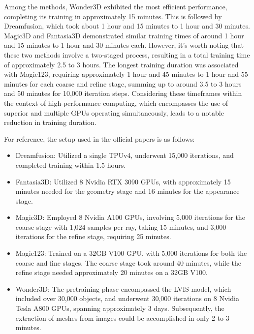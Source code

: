 Among the methods, Wonder3D exhibited the most efficient performance, completing its training in approximately 15 minutes. This is followed by Dreamfusion, which took about 1 hour and 15 minutes to 1 hour and 30 minutes. Magic3D and Fantasia3D demonstrated similar training times of around 1 hour and 15 minutes to 1 hour and 30 minutes each. However, it's worth noting that these two methods involve a two-staged process, resulting in a total training time of approximately 2.5 to 3 hours. The longest training duration was associated with Magic123, requiring approximately 1 hour and 45 minutes to 1 hour and 55 minutes for each coarse and refine stage, summing up to around 3.5 to 3 hours and 50 minutes for 10,000 iteration steps. 
Considering these timeframes within the context of high-performance computing, which encompasses the use of superior and multiple GPUs operating simultaneously, leads to a notable reduction in training duration.

For reference, the setup used in the official papers is as follows:

\begin{itemize}
    \item Dreamfusion: Utilized a single TPUv4, underwent 15,000 iterations, and completed training within 1.5 hours.
    
    \item Fantasia3D\@: Utilized 8 Nvidia RTX 3090 GPUs, with approximately 15 minutes needed for the geometry stage and 16 minutes for the appearance stage.
    
    \item Magic3D\@: Employed 8 Nvidia A100 GPUs, involving 5,000 iterations for the coarse stage with 1,024 samples per ray, taking 15 minutes, and 3,000 iterations for the refine stage, requiring 25 minutes.
    
    \item Magic123: Trained on a 32GB V100 GPU, with 5,000 iterations for both the coarse and fine stages. The coarse stage took around 40 minutes, while the refine stage needed approximately 20 minutes on a 32GB V100.
    
    \item Wonder3D\@: The pretraining phase encompassed the LVIS model, which included over 30,000 objects, and underwent 30,000 iterations on 8 Nvidia Tesla A800 GPUs, spanning approximately 3 days. Subsequently, the extraction of meshes from images could be accomplished in only 2 to 3 minutes.
\end{itemize}


